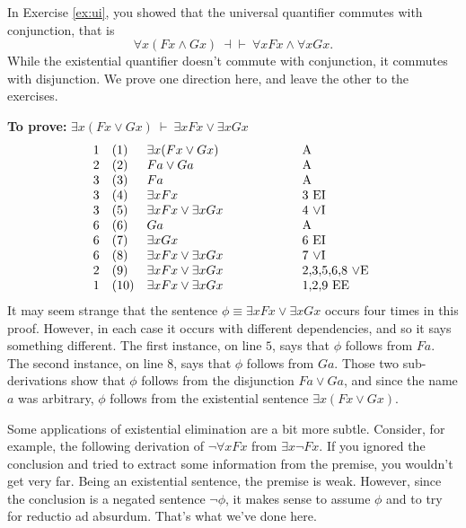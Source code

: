 In Exercise \ref{ex:ui}, you showed that the universal quantifier commutes with
conjunction, that is
\[ \forall x(Fx\wedge Gx)\:\dashv\vdash\: \forall xFx\wedge \forall xGx . \]
While the existential quantifier doesn't commute with conjunction, it
commutes with disjunction.  We prove one direction here, and leave
the other to the exercises.

\medskip \noindent \textbf{To prove:} $\exists x(Fx\vee Gx)\:\vdash\: \exists
xFx\vee\exists xGx$
\[ \begin{array}{l l >{$}p{4cm}<{$} p{2cm}}
     1 & (1) & \exists x(Fx\vee Gx) & A \\
     2 & (2) & Fa\vee Ga            & A \\
     3 & (3) & Fa                   & A \\
     3 & (4) & \exists xFx          & 3 EI \\
     3 & (5) & \exists xFx\vee \exists xGx & 4 $\vee$I \\
     6 & (6) & Ga                   & A \\
     6 & (7) & \exists xGx          & 6 EI \\
     6 & (8) & \exists xFx\vee\exists xGx & 7 $\vee$I \\
     2 & (9) & \exists xFx\vee\exists xGx & 2,3,5,6,8 $\vee$E \\
     1 & (10) & \exists xFx\vee\exists xGx & 1,2,9 EE \end{array} \]
 It may seem strange that the sentence $\phi\equiv \exists xFx\vee\exists xGx$
 occurs four times in this proof.  However, in each case it occurs
 with different dependencies, and so it says something different.  The
 first instance, on line $5$, says that $\phi$ follows from $Fa$.  The
 second instance, on line $8$, says that $\phi$ follows from $Ga$.  Those two sub-derivations
 show that $\phi$ follows from the disjunction
 $Fa\vee Ga$, and since the name $a$ was arbitrary, $\phi$
 follows from the existential sentence $\exists x(Fx\vee Gx)$.

Some applications of existential elimination are a bit more subtle.
Consider, for example, the following derivation of $\neg\forall xFx$
from $\exists x\neg Fx$.  If you ignored the conclusion and tried to
extract some information from the premise, you wouldn't get very far.
Being an existential sentence, the premise is weak.  However, since
the conclusion is a negated sentence $\neg \phi$, it makes sense to
assume $\phi$ and to try for reductio ad absurdum. That's what we've
done here. \label{argh}

